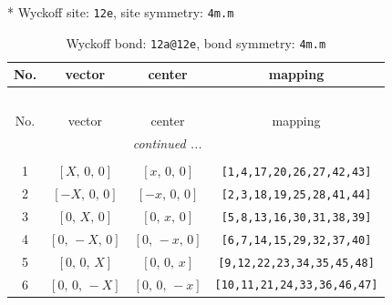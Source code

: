 \documentclass[fleqn,8pt]{jsarticle}
\begin{document}
* Wyckoff site: {\tt 12e}, site symmetry: {\tt 4m.m}
\renewcommand{\arraystretch}{1.2}
\begin{longtable}{cccc}
\caption{Wyckoff bond: {\tt 12a@12e}, bond symmetry: {\tt 4m.m}}
 \\
 \hline \hline
No. & vector & center & mapping \\ \hline \endfirsthead

\multicolumn{3}{l}{\tablename\ \thetable{}} \\
 \hline \hline
No. & vector & center & mapping \\ \hline \endhead

 \hline \hline
\multicolumn{3}{r}{\footnotesize\it continued ...} \\ \endfoot

 \hline \hline
\multicolumn{3}{r}{} \\ \endlastfoot

1 & $\left[ X,\, 0,\, 0 \right]$ & $\left[ x,\, 0,\, 0 \right]$ & {\tt [1,4,17,20,26,27,42,43]} \\ \hline
2 & $\left[ - X,\, 0,\, 0 \right]$ & $\left[ - x,\, 0,\, 0 \right]$ & {\tt [2,3,18,19,25,28,41,44]} \\ \hline
3 & $\left[ 0,\, X,\, 0 \right]$ & $\left[ 0,\, x,\, 0 \right]$ & {\tt [5,8,13,16,30,31,38,39]} \\ \hline
4 & $\left[ 0,\, - X,\, 0 \right]$ & $\left[ 0,\, - x,\, 0 \right]$ & {\tt [6,7,14,15,29,32,37,40]} \\ \hline
5 & $\left[ 0,\, 0,\, X \right]$ & $\left[ 0,\, 0,\, x \right]$ & {\tt [9,12,22,23,34,35,45,48]} \\ \hline
6 & $\left[ 0,\, 0,\, - X \right]$ & $\left[ 0,\, 0,\, - x \right]$ & {\tt [10,11,21,24,33,36,46,47]} \\
\end{longtable}
\renewcommand{\arraystretch}{1.2}
\end{document}
